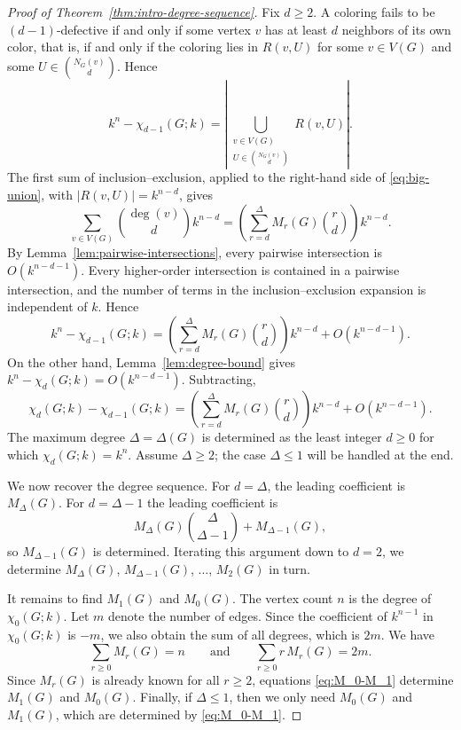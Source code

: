 \documentclass[12pt,reqno]{amsart}
\theoremstyle{definition}
\begin{document}
\begin{proof}[Proof of Theorem~\ref{thm:intro-degree-sequence}]
Fix $d\geq 2$. A coloring fails to be $(d-1)$-defective if and only if some vertex $v$ has at least $d$ neighbors of its own color, that is, if and only if the coloring lies in $R(v,U)$ for some $v\in V(G)$ and some $U\in \binom{N_G(v)}{d}$. Hence
\begin{equation}\label{eq:big-union}
k^n-\chi_{d-1}(G;k)=\left|\bigcup_{\substack{v\in V(G)\\ U\in \binom{N_G(v)}{d}}} R(v,U)\right|.
\end{equation}
The first sum of inclusion--exclusion, applied to the right-hand side of \eqref{eq:big-union}, with $|R(v,U)|=k^{n-d}$, gives
\[
\sum_{v\in V(G)} \binom{\deg(v)}{d}k^{n-d}
=
\left(\sum_{r=d}^{\Delta} M_r(G)\binom{r}{d}\right)k^{n-d}.
\]
By Lemma~\ref{lem:pairwise-intersections}, every pairwise intersection is $O(k^{n-d-1})$. Every higher-order intersection is contained in a pairwise intersection, and the number of terms in the inclusion--exclusion expansion is independent of $k$. Hence
\[
k^n-\chi_{d-1}(G;k)
=
\left(\sum_{r=d}^{\Delta} M_r(G)\binom{r}{d}\right)k^{n-d}
+O(k^{n-d-1}).
\]
On the other hand, Lemma~\ref{lem:degree-bound} gives $k^n-\chi_d(G;k)=O(k^{n-d-1})$. Subtracting,
\[
\chi_d(G;k)-\chi_{d-1}(G;k)
=
\left(\sum_{r=d}^{\Delta} M_r(G)\binom{r}{d}\right)k^{n-d}
+O(k^{n-d-1}).
\]
The maximum degree $\Delta=\Delta(G)$ is determined as the least integer $d\geq 0$ for which $\chi_d(G;k)=k^n$. Assume $\Delta\geq 2$; the case $\Delta\leq 1$ will be handled at the end.

We now recover the degree sequence. For $d=\Delta$, the leading coefficient is $M_\Delta(G)$. For $d=\Delta-1$ the leading coefficient is
\[
M_\Delta(G)\binom{\Delta}{\Delta-1}+M_{\Delta-1}(G),
\]
so $M_{\Delta-1}(G)$ is determined. Iterating this argument down to $d=2$, we determine $M_\Delta(G)$, $M_{\Delta-1}(G)$, $\dots$, $M_2(G)$ in turn. 

It remains to find $M_1(G)$ and $M_0(G)$. The vertex count $n$ is the degree of $\chi_0(G;k)$. Let $m$ denote the number of edges. Since the coefficient of $k^{n-1}$ in $\chi_0(G;k)$ is $-m$, we also obtain the sum of all degrees, which is $2m$. We have
\begin{equation}\label{eq:M_0-M_1}
\sum_{r\geq 0} M_r(G)=n
\qquad\text{and}\qquad
\sum_{r\geq 0} r\,M_r(G)=2m.
\end{equation}
Since $M_r(G)$ is already known for all $r\geq 2$, equations \eqref{eq:M_0-M_1} determine $M_1(G)$ and $M_0(G)$. Finally, if $\Delta\leq 1$, then we only need $M_0(G)$ and $M_1(G)$, which are determined by \eqref{eq:M_0-M_1}.
\end{proof}
\end{document}
